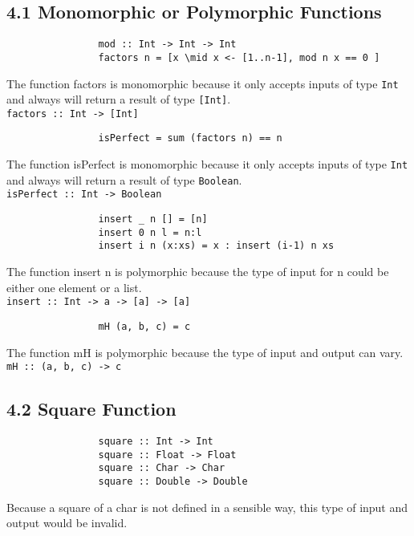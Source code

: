 \documentclass{article}
\begin{document}
	\pagestyle{fancy}
	\hfill
	
	\subsection*{4.1 Monomorphic or Polymorphic Functions}
	\begin{adjustwidth}{2em}{2em}
		\begin{tcolorbox}
			\begin{verbatim}
				mod :: Int -> Int -> Int
				factors n = [x \mid x <- [1..n-1], mod n x == 0 ]
			\end{verbatim}
		\end{tcolorbox}
		\noindent The function factors is monomorphic because it only accepts inputs of type \texttt{Int} and always will return a result of type \texttt{[Int]}. \\
		\texttt{factors :: Int -> [Int]} \\
		\begin{tcolorbox}
			\begin{verbatim}
				isPerfect = sum (factors n) == n
			\end{verbatim}
		\end{tcolorbox}
		\noindent The function isPerfect is monomorphic because it only accepts inputs of type \texttt{Int} and always will return a result of type \texttt{Boolean}. \\
		\texttt{isPerfect :: Int -> Boolean}
		\begin{tcolorbox}
			\begin{verbatim}
				insert _ n [] = [n]
				insert 0 n l = n:l
				insert i n (x:xs) = x : insert (i-1) n xs
			\end{verbatim}
		\end{tcolorbox}
		\noindent The function insert n is polymorphic because the type of input for n could be either one element or a list. \\
		\texttt{insert :: Int -> a -> [a] -> [a]}
		\begin{tcolorbox}
			\begin{verbatim}
				mH (a, b, c) = c
			\end{verbatim}
		\end{tcolorbox}
		\noindent The function mH is polymorphic because the type of input and output can vary. \\
		\texttt{mH :: (a, b, c) -> c}
	\end{adjustwidth}
	
	\subsection*{4.2 Square Function}
	\begin{adjustwidth}{2em}{2em}
		\begin{tcolorbox}
			\begin{verbatim}
				square :: Int -> Int
				square :: Float -> Float
				square :: Char -> Char
				square :: Double -> Double
			\end{verbatim}
		\end{tcolorbox}
		\noindent Because a square of a char is not defined in a sensible way, this type of input and output would be invalid.
	\end{adjustwidth}
	
\end{document}
